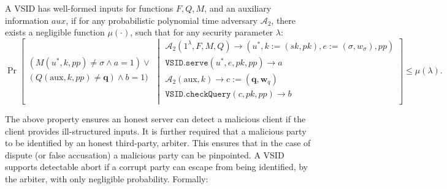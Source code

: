 \begin{definition}\label{deff::VSID-Inputs-Well-formedess}  A  VSID  has  well-formed inputs for functions $F,Q,M$, and an auxiliary information $aux$,  if for  any probabilistic polynomial time adversary $\mathcal{A}_{\scriptscriptstyle 2}$, there exists a negligible function $\mu(\cdot)$, such that for any security parameter $\lambda$: 
\small{
$$ \Pr\left[
  \begin{array}{l}
  (M(u^{\scriptscriptstyle *},k,{pp})\neq \sigma \wedge a=1) \vee\\ (Q(\text{aux},k,{pp})\neq \bm{q}) \wedge  b=1)\\
\end{array} \middle |
    \begin{array}{l}
    
    \mathcal{A}_{\scriptscriptstyle 2}(1^{\scriptscriptstyle\lambda},F,M,Q)\rightarrow (u^{\scriptscriptstyle *},k:=(sk,pk),e:=(\sigma,w_{\sigma}),{pp})\\
    \mathtt{VSID.serve}(u^{\scriptscriptstyle *},e,pk,{pp})\rightarrow a\\
       \mathcal{A}_{\scriptscriptstyle 2}(\text{aux},k)\rightarrow c:=(\bm{q},\bm{w}_{\scriptscriptstyle q})\\
    \mathtt{VSID.checkQuery}(c, pk,{pp})\rightarrow b\\
\end{array}    \right]\leq \mu(\lambda).$$
}

\end{definition}

The   above property ensures an honest server can detect  a malicious client if the client provides ill-structured inputs. It is further required that a malicious party to be identified by an honest third-party, arbiter. This ensures that in the case of dispute (or false accusation) a malicious party can be pinpointed. A VSID supports  detectable abort if a corrupt party can escape from being identified, by the arbiter,  with only negligible probability.  Formally:



